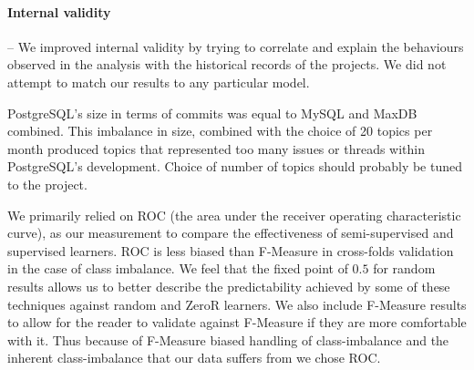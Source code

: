 \documentclass[smallextended]{svjour3}       %
\begin{document}
\paragraph{Internal validity} -- %
We improved internal validity by trying to correlate and explain the behaviours observed in the analysis with the historical records of the projects.
We did not attempt to match our results to any particular model.

PostgreSQL's size in terms of commits was equal to MySQL and MaxDB
combined. This imbalance in size, combined with the choice of 20
topics per month produced topics that represented too many issues or
threads within PostgreSQL's development. Choice of number of topics
should probably be tuned to the project.

We primarily relied on ROC (the area under the receiver operating
characteristic curve), as our measurement to compare the effectiveness
of semi-supervised and supervised learners. ROC is less biased than
F-Measure in cross-folds
validation~\cite{flach-icml03,Forman:2010:ACS:1882471.1882479} in the
case of class imbalance. We
feel that the fixed point of $0.5$ for random results allows us to
better describe the predictability achieved by some of these
techniques against random and ZeroR learners. 
We also include
F-Measure results to allow for the reader to validate against
F-Measure if they are more comfortable with it. Thus because of
F-Measure biased handling of class-imbalance and the inherent
class-imbalance that our data suffers from we chose ROC.
\end{document}
